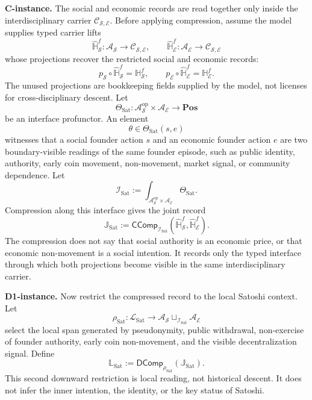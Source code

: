 \documentclass[11pt]{article}
\newcommand{\op}{\mathrm{op}}
\newcommand{\defeq}{\mathrel{:=}}
\newcommand{\CComp}{\mathsf{CComp}}
\newcommand{\DComp}{\mathsf{DComp}}
\newcommand{\Pos}{\mathbf{Pos}}
\theoremstyle{definition}
\theoremstyle{plain}
\begin{document}
\textbf{C-instance.}  The social and economic records are read together only
inside the interdisciplinary carrier $\mathcal C_{\mathcal S,\mathcal E}$.
Before applying compression, assume the model supplies typed carrier lifts
\[
  \widehat{\mathbb H}_{\mathcal S}^{f}:
  \mathcal A_{\mathcal S}\to \mathcal C_{\mathcal S,\mathcal E},
  \qquad
  \widehat{\mathbb H}_{\mathcal E}^{f}:
  \mathcal A_{\mathcal E}\to \mathcal C_{\mathcal S,\mathcal E}
\]
whose projections recover the restricted social and economic records:
\[
  p_{\mathcal S}\circ\widehat{\mathbb H}_{\mathcal S}^{f}
  =
  \mathbb H_{\mathcal S}^{f},
  \qquad
  p_{\mathcal E}\circ\widehat{\mathbb H}_{\mathcal E}^{f}
  =
  \mathbb H_{\mathcal E}^{f}.
\]
The unused projections are bookkeeping fields supplied by the model, not
licenses for cross-disciplinary descent.
Let
\[
  \Theta_{\mathrm{Sat}}:
  \mathcal A_{\mathcal S}^{\op}\times\mathcal A_{\mathcal E}
  \to \Pos
\]
be an interface profunctor.  An element
\[
  \theta\in\Theta_{\mathrm{Sat}}(s,e)
\]
witnesses that a social founder action $s$ and an economic founder action
$e$ are two boundary-visible readings of the same founder episode, such as
public identity, authority, early coin movement, non-movement, market
signal, or community dependence.  Let
\[
  \mathcal I_{\mathrm{Sat}}
  \defeq
  \int_{\mathcal A_{\mathcal S}^{\op}\times\mathcal A_{\mathcal E}}
  \Theta_{\mathrm{Sat}}.
\]
Compression along this interface gives the joint record
\[
  \mathbb J_{\mathrm{Sat}}
  \defeq
  \CComp_{\mathcal I_{\mathrm{Sat}}}
  (\widehat{\mathbb H}_{\mathcal S}^{f},
   \widehat{\mathbb H}_{\mathcal E}^{f}).
\]
The compression does not say that social authority is an economic price,
or that economic non-movement is a social intention.  It records only the
typed interface through which both projections become visible in the same
interdisciplinary carrier.

\textbf{D1-instance.}  Now restrict the compressed record to the local Satoshi
context.  Let
\[
  \rho_{\mathrm{Sat}}:
  \mathcal L_{\mathrm{Sat}}
  \to
  \mathcal A_{\mathcal S}\sqcup_{\mathcal I_{\mathrm{Sat}}}
  \mathcal A_{\mathcal E}
\]
select the local span generated by pseudonymity, public withdrawal,
non-exercise of founder authority, early coin non-movement, and the
visible decentralization signal.  Define
\[
  \mathbb L_{\mathrm{Sat}}
  \defeq
  \DComp_{\rho_{\mathrm{Sat}}}(\mathbb J_{\mathrm{Sat}}).
\]
This second downward restriction is local reading, not historical
descent.  It does not infer the inner intention, the identity, or the key
status of Satoshi.
\end{document}
